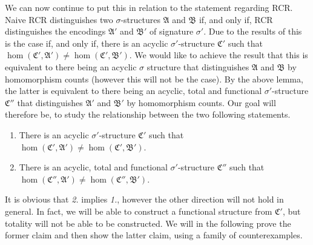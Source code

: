 We can now continue to put this in relation to the statement regarding RCR.
Naive RCR distinguishes two $\sigma$-structures $\mathfrak A$ and $\mathfrak B$ if, and only if, RCR distinguishes the encodings $\mathfrak A'$ and $\mathfrak B'$ of signature $\sigma'$.
Due to the results of \cite{scheidt2025ColorRefinement} this is the case if, and only if, there is an acyclic $\sigma'$-structure $\mathfrak C'$ such that $\hom(\mathfrak C',\mathfrak A')\neq\hom(\mathfrak C',\mathfrak B')$.
We would like to achieve the result that this is equivalent to there being an acyclic $\sigma$ structure that distinguishes $\mathfrak A$ and $\mathfrak B$ by homomorphism counts (however this will not be the case).
By the above lemma, the latter is equivalent to there being an acyclic, total and functional $\sigma'$-structure $\mathfrak C''$ that distinguishes $\mathfrak A'$ and $\mathfrak B'$ by homomorphism counts.
Our goal will therefore be, to study the relationship between the two following statements.
\begin{enumerate}
	\item There is an acyclic $\sigma'$-structure $\mathfrak C'$ such that $\hom(\mathfrak C',\mathfrak A')\neq\hom(\mathfrak C',\mathfrak B')$.
	\item There is an acyclic, total and functional $\sigma'$-structure $\mathfrak C''$ such that $\hom(\mathfrak C'',\mathfrak A')\neq\hom(\mathfrak C'',\mathfrak B')$.
\end{enumerate}

It is obvious that \emph{2.} implies \emph{1.}, however the other direction will not hold in general.
In fact, we will be able to construct a functional structure from $\mathfrak C'$, but totality will not be able to be constructed.
We will in the following prove the former claim and then show the latter claim, using a family of counterexamples.

